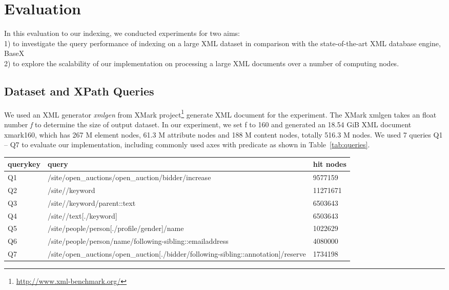 \section{Evaluation}
\label{sec:evaluation}

In this evaluation to our indexing, we conducted experiments for two aims: \\
1) to investigate the query performance of indexing on a large XML dataset 
in comparison with the state-of-the-art XML database engine, BaseX\\ 
2) to explore the scalability of our implementation on processing 
a large XML documents over a number of computing nodes.

\subsection{Dataset and XPath Queries} 

We used an XML generator \emph{xmlgen} from XMark
project\footnote{\url{http://www.xml-benchmark.org/}} generate XML document for
the experiment. The XMark xmlgen takes an float number \emph{f} to determine the
size of output dataset. In our experiment, we set f to 160 and generated an
18.54 GiB XML document xmark160, which has 267 M element nodes, 61.3 M attribute
nodes and 188 M content nodes, totally 516.3 M nodes. We used 7 queries Q1 -- Q7
to evaluate our implementation, including commonly used axes with predicate as 
shown in Table~\ref{tab:queries}.


\begin{table*}[ht]
\centering
\caption{Queries used for xmark160 dataset.}
\label{tab:queries}
\begin{tabular}{|l|l|l|}
\hline
querykey & query                                                                                  & hit nodes \\ \hline
Q1       & /site/open\_auctions/open\_auction/bidder/increase                                     & 9577159   \\ \hline
Q2       & /site//keyword                                                                         & 11271671  \\ \hline
Q3       & /site//keyword/parent::text                                                            & 6503643   \\ \hline
Q4       & /site//text{[}./keyword{]}                                                             & 6503643   \\ \hline
Q5       & /site/people/person{[}./profile/gender{]}/name                                         & 1022629   \\ \hline
Q6       & /site/people/person/name/following-sibling::emailaddress                               & 4080000   \\ \hline
Q7       & /site/open\_auctions/open\_auction{[}./bidder/following-sibling::annotation{]}/reserve & 1734198   \\ \hline
\end{tabular}
\end{table*}


